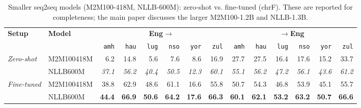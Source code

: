 \begin{table}[t]
\centering
\small
\renewcommand{\arraystretch}{1.05}
\begin{tabular}{llrrrrrrrrrrrr}
\toprule
\textbf{Setup} & \textbf{Model} & \multicolumn{6}{c}{\textbf{Eng$\to$}} & \multicolumn{6}{c}{\textbf{$\to$Eng}} \\
\cmidrule(lr){3-8}\cmidrule(lr){9-14}
  &   & \texttt{amh} & \texttt{hau} & \texttt{lug} & \texttt{nso} & \texttt{yor} & \texttt{zul} & \texttt{amh} & \texttt{hau} & \texttt{lug} & \texttt{nso} & \texttt{yor} & \texttt{zul} \\
\midrule
\multirow{2}{*}{\textit{Zero-shot}} & M2M100\textunderscore{}418M & 6.2 & 14.8 & 5.6 & 7.6 & 8.6 & 16.9 & 27.7 & 27.5 & 16.4 & 17.6 & 15.2 & 33.7 \\
 & NLLB\textunderscore{}600M & \emph{37.1} & \emph{56.2} & \emph{40.4} & \emph{50.5} & \emph{12.3} & \emph{60.1} & \emph{55.1} & \emph{56.2} & \emph{47.2} & \emph{56.1} & \emph{43.6} & \emph{61.2} \\
\midrule
\multirow{2}{*}{\textit{Fine-tuned}} & M2M100\textunderscore{}418M & 38.8 & 62.9 & 48.6 & 61.1 & 16.6 & 55.8 & 50.7 & 54.3 & 46.8 & 53.9 & 45.1 & 55.7 \\
 & NLLB\textunderscore{}600M & \textbf{44.4} & \textbf{66.9} & \textbf{50.6} & \textbf{64.2} & \textbf{17.6} & \textbf{66.3} & \textbf{60.1} & \textbf{62.1} & \textbf{53.2} & \textbf{63.2} & \textbf{50.7} & \textbf{66.6} \\
\bottomrule
\end{tabular}
\caption{Smaller seq2seq models (M2M100-418M, NLLB-600M): zero-shot vs. fine-tuned (chrF). These are reported for completeness; the main paper discusses the larger M2M100-1.2B and NLLB-1.3B.}
\label{tab:seq2seq_smaller_chrf}
\end{table}

